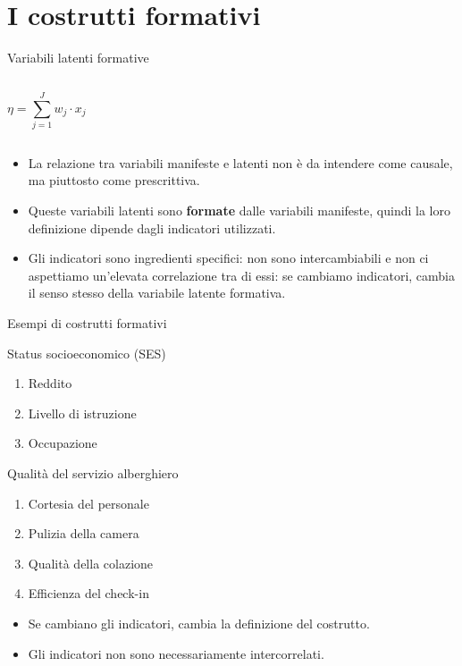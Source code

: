 \documentclass{beamer}
\begin{document}
\section{I costrutti formativi}
\begin{frame}{Variabili latenti formative}
        \begin{columns}
    \[
    \eta = \sum_{j=1}^{J} w_{j} \cdot x_{j}
    \]
    \end{columns}
    \vspace{1em}
    \pause
    \small
    \begin{itemize}
        \item La relazione tra variabili manifeste e latenti non è da intendere come causale, ma piuttosto come prescrittiva.
        \item Queste variabili latenti sono \textbf{formate} dalle variabili manifeste, quindi la loro definizione dipende dagli indicatori utilizzati.
        \item Gli indicatori sono ingredienti specifici: non sono intercambiabili e non ci aspettiamo un'elevata correlazione tra di essi: se cambiamo indicatori, cambia il senso stesso della variabile latente formativa.
    \end{itemize}
\end{frame}

\begin{frame}{Esempi di costrutti formativi}
\begin{block}{Status socioeconomico (SES)}
    \begin{enumerate}
        \item Reddito
        \item Livello di istruzione
        \item Occupazione
    \end{enumerate}
\end{block}
\begin{block}{Qualità del servizio alberghiero}
    \begin{enumerate}
        \item Cortesia del personale
        \item Pulizia della camera
        \item Qualità della colazione
        \item Efficienza del check-in
    \end{enumerate}
\end{block}
\small
\begin{itemize}
    \item Se cambiano gli indicatori, cambia la definizione del costrutto.
    \item Gli indicatori non sono necessariamente intercorrelati.
\end{itemize}
\end{frame}
\end{document}
